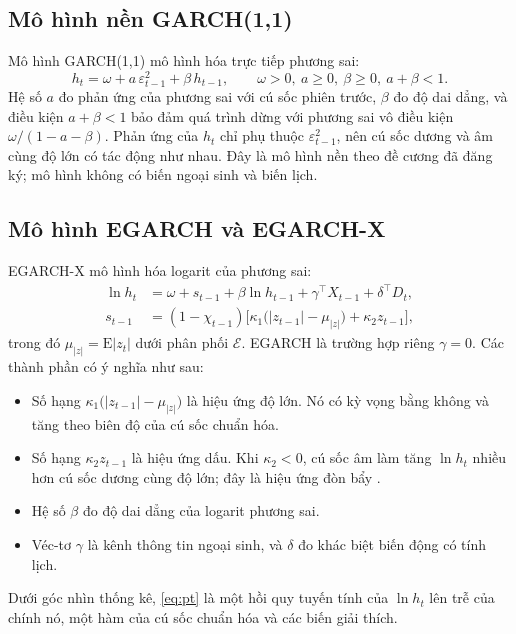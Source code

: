\documentclass[12pt,a4paper]{article}
\theoremstyle{definition}
\theoremstyle{remark}
\newcommand{\E}{\mathrm{E}}
\newcommand{\Ecal}{\mathcal{E}}
\begin{document}
\subsection{Mô hình nền GARCH(1,1)}

Mô hình GARCH(1,1) \cite{bollerslev1986} mô hình hóa trực tiếp phương sai:
\begin{equation}\label{eq:garch}
h_t=\omega+a\,\varepsilon_{t-1}^2+\beta\,h_{t-1},\qquad \omega>0,\ a\ge0,\ \beta\ge0,\ a+\beta<1 .
\end{equation}
Hệ số $a$ đo phản ứng của phương sai với cú sốc phiên trước, $\beta$ đo độ dai dẳng, và điều kiện $a+\beta<1$ bảo đảm quá trình dừng với phương sai vô điều kiện $\omega/(1-a-\beta)$. Phản ứng của $h_t$ chỉ phụ thuộc $\varepsilon_{t-1}^2$, nên cú sốc dương và âm cùng độ lớn có tác động như nhau. Đây là mô hình nền theo đề cương đã đăng ký; mô hình không có biến ngoại sinh và biến lịch.

\subsection{Mô hình EGARCH và EGARCH-X}

EGARCH-X mô hình hóa logarit của phương sai:
\begin{align}
\ln h_t&=\omega+s_{t-1}+\beta\ln h_{t-1}+\gamma^\top X_{t-1}+\delta^\top D_t, \label{eq:pt}\\
s_{t-1}&=(1-\chi_{t-1})\big[\kappa_1\big(|z_{t-1}|-\mu_{|z|}\big)+\kappa_2 z_{t-1}\big], \label{eq:sock}
\end{align}
trong đó $\mu_{|z|}=\E|z_t|$ dưới phân phối $\Ecal$. EGARCH là trường hợp riêng $\gamma=0$. Các thành phần có ý nghĩa như sau:
\begin{itemize}
\item Số hạng $\kappa_1\big(|z_{t-1}|-\mu_{|z|}\big)$ là hiệu ứng độ lớn. Nó có kỳ vọng bằng không và tăng theo biên độ của cú sốc chuẩn hóa.
\item Số hạng $\kappa_2 z_{t-1}$ là hiệu ứng dấu. Khi $\kappa_2<0$, cú sốc âm làm tăng $\ln h_t$ nhiều hơn cú sốc dương cùng độ lớn; đây là hiệu ứng đòn bẩy \cite{nelson1991}.
\item Hệ số $\beta$ đo độ dai dẳng của logarit phương sai.
\item Véc-tơ $\gamma$ là kênh thông tin ngoại sinh, và $\delta$ đo khác biệt biến động có tính lịch.
\end{itemize}
Dưới góc nhìn thống kê, \eqref{eq:pt} là một hồi quy tuyến tính của $\ln h_t$ lên trễ của chính nó, một hàm của cú sốc chuẩn hóa và các biến giải thích.
\end{document}
